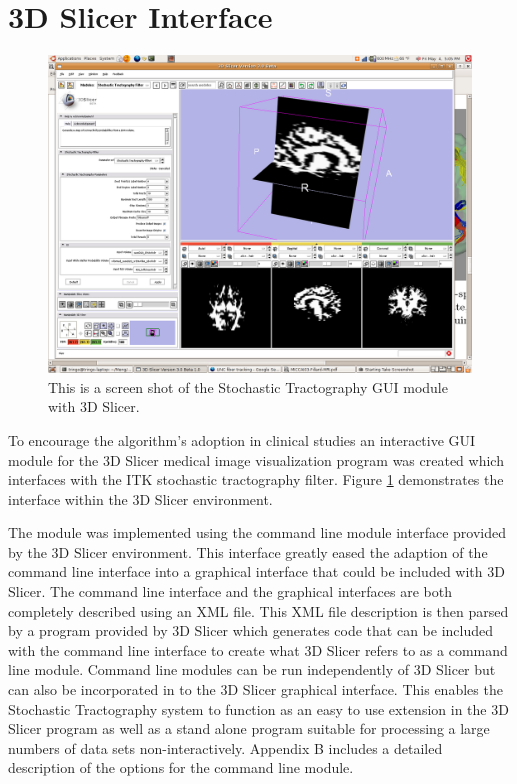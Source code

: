 \section{3D Slicer Interface}
\begin{figure} \label{fig:slicermodule}
  \center
	\includegraphics[width=0.5\linewidth]{slicermodule}
	\caption{This is a screen shot of the Stochastic Tractography GUI module with 3D Slicer.}
\end{figure}
To encourage the algorithm's adoption in clinical studies an interactive GUI module for the 3D Slicer medical image visualization program was created which interfaces with the ITK stochastic tractography filter.  Figure \ref{fig:slicermodule} demonstrates the interface within the 3D Slicer environment.

The module was implemented using the command line module interface provided by the 3D Slicer environment.  This interface greatly eased the adaption of the command line interface into a graphical interface that could be included with 3D Slicer.  The command line interface and the graphical interfaces are both completely described using an XML file.  This XML file description is then parsed by a program provided by 3D Slicer which generates code that can be included with the command line interface to create what 3D Slicer refers to as a command line module.  Command line modules can be run independently of 3D Slicer but can also be incorporated in to the 3D Slicer graphical interface.  This enables the Stochastic Tractography system to function as an easy to use extension in the 3D Slicer program as well as a stand alone program suitable for processing a large numbers of data sets non-interactively.  Appendix B includes a detailed description of the options for the command line module.


